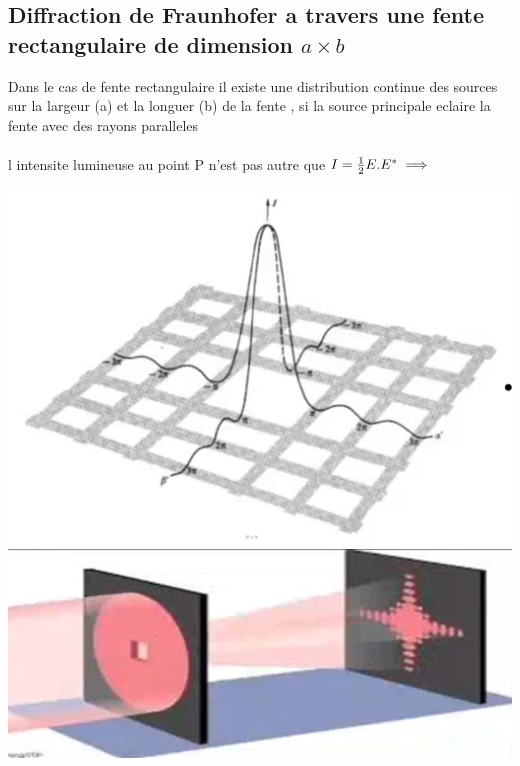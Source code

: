\documentclass[12pt]{book}
\begin{document}
            \subsection{Diffraction de Fraunhofer a travers une fente rectangulaire de dimension $a \times b$}    
                Dans le cas de fente rectangulaire il existe une distribution continue des sources sur la largeur (a) et la longuer (b) de la fente , si la source principale eclaire la fente avec des rayons paralleles \\
                \\
                l intensite lumineuse au point P n'est pas autre que $ I =\frac{1}{2}E.E^{*} \\ 
                \implies $  \\
                \begin{center}
                    \includegraphics[width=0.49\linewidth]{pic/diffractionfenterectangulair1.png}
                    \includegraphics[width=0.49\linewidth]{pic/diffractionfenterectangulair2.png}
                \end{center}
        \pagebreak
\end{document}
